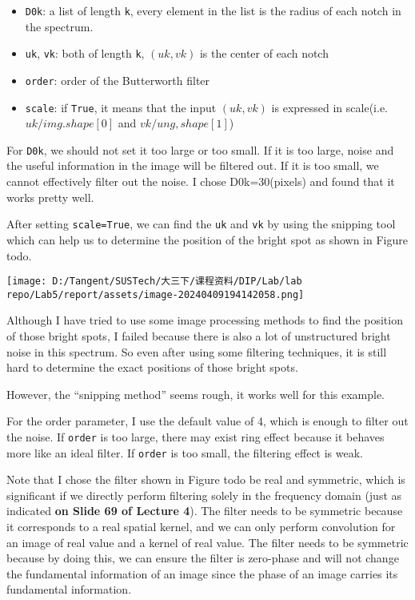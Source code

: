 \documentclass[
]{article}
\begin{document}
\begin{itemize}
\item
  \texttt{D0k}: a list of length \texttt{k}, every element in the list
  is the radius of each notch in the spectrum.
\item
  \texttt{uk}, \texttt{vk}: both of length \texttt{k}, \((uk, vk)\) is
  the center of each notch
\item
  \texttt{order}: order of the Butterworth filter
\item
  \texttt{scale}: if \texttt{True}, it means that the input \((uk, vk)\)
  is expressed in scale(i.e. \(uk/img.shape[0]\) and
  \(vk/ung,shape[1]\))
\end{itemize}

For \texttt{D0k}, we should not set it too large or too small. If it is
too large, noise and the useful information in the image will be
filtered out. If it is too small, we cannot effectively filter out the
noise. I chose D0k=30(pixels) and found that it works pretty well.

After setting \texttt{scale=True}, we can find the \texttt{uk} and
\texttt{vk} by using the snipping tool which can help us to determine
the position of the bright spot as shown in Figure todo.

\texttt{[image: D:/Tangent/SUSTech/大三下/课程资料/DIP/Lab/lab repo/Lab5/report/assets/image-20240409194142058.png]}

Although I have tried to use some image processing methods to find the
position of those bright spots, I failed because there is also a lot of
unstructured bright noise in this spectrum. So even after using some
filtering techniques, it is still hard to determine the exact positions
of those bright spots.

However, the ``snipping method'' seems rough, it works well for this
example.

For the order parameter, I use the default value of 4, which is enough
to filter out the noise. If \texttt{order} is too large, there may exist
ring effect because it behaves more like an ideal filter. If
\texttt{order} is too small, the filtering effect is weak.

Note that I chose the filter shown in Figure todo be real and symmetric,
which is significant if we directly perform filtering solely in the
frequency domain (just as indicated \textbf{on Slide 69 of Lecture 4}).
The filter needs to be symmetric because it corresponds to a real
spatial kernel, and we can only perform convolution for an image of real
value and a kernel of real value. The filter needs to be symmetric
because by doing this, we can ensure the filter is zero-phase and will
not change the fundamental information of an image since the phase of an
image carries its fundamental information.
\end{document}
